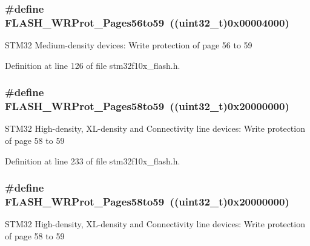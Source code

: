 \subsubsection[{\texorpdfstring{F\+L\+A\+S\+H\+\_\+\+W\+R\+Prot\+\_\+\+Pages56to59}{FLASH_WRProt_Pages56to59}}]{\setlength{\rightskip}{0pt plus 5cm}\#define F\+L\+A\+S\+H\+\_\+\+W\+R\+Prot\+\_\+\+Pages56to59~(({\bf uint32\+\_\+t})0x00004000)}\hypertarget{group___option___bytes___write___protection_ga3705c210feeeb63c31976495c0b851f1}{}\label{group___option___bytes___write___protection_ga3705c210feeeb63c31976495c0b851f1}
S\+T\+M32 Medium-\/density devices\+: Write protection of page 56 to 59 

Definition at line 126 of file stm32f10x\+\_\+flash.\+h.

\subsubsection[{\texorpdfstring{F\+L\+A\+S\+H\+\_\+\+W\+R\+Prot\+\_\+\+Pages58to59}{FLASH_WRProt_Pages58to59}}]{\setlength{\rightskip}{0pt plus 5cm}\#define F\+L\+A\+S\+H\+\_\+\+W\+R\+Prot\+\_\+\+Pages58to59~(({\bf uint32\+\_\+t})0x20000000)}\hypertarget{group___option___bytes___write___protection_ga4a05bf4eec7521ae90ff662db2a9f4f5}{}\label{group___option___bytes___write___protection_ga4a05bf4eec7521ae90ff662db2a9f4f5}
S\+T\+M32 High-\/density, X\+L-\/density and Connectivity line devices\+: Write protection of page 58 to 59 

Definition at line 233 of file stm32f10x\+\_\+flash.\+h.

\subsubsection[{\texorpdfstring{F\+L\+A\+S\+H\+\_\+\+W\+R\+Prot\+\_\+\+Pages58to59}{FLASH_WRProt_Pages58to59}}]{\setlength{\rightskip}{0pt plus 5cm}\#define F\+L\+A\+S\+H\+\_\+\+W\+R\+Prot\+\_\+\+Pages58to59~(({\bf uint32\+\_\+t})0x20000000)}\hypertarget{group___option___bytes___write___protection_ga4a05bf4eec7521ae90ff662db2a9f4f5}{}\label{group___option___bytes___write___protection_ga4a05bf4eec7521ae90ff662db2a9f4f5}
S\+T\+M32 High-\/density, X\+L-\/density and Connectivity line devices\+: Write protection of page 58 to 59 

